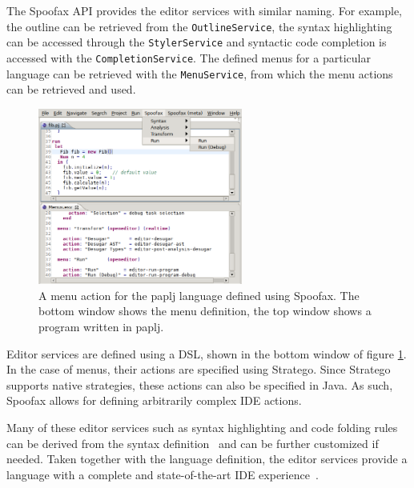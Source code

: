 The Spoofax API provides the editor services with similar naming. For
example, the outline can be retrieved from the \texttt{OutlineService}, the
syntax highlighting can be accessed through the \texttt{StylerService} and
syntactic code completion is accessed with the
\texttt{CompletionService}. The defined menus for a particular language can
be retrieved with the \texttt{MenuService}, from which the menu actions can
be retrieved and used.

\begin{figure}[htb]
\centering
\includegraphics[width=0.6\textwidth]{./img/menu-actions.png}
\caption{\label{fig:menu-actions}
A menu action for the paplj language defined using Spoofax. The bottom window shows the menu definition, the top window shows a program written in paplj.}
\end{figure}

Editor services are defined using a DSL, shown in the bottom window of
figure \ref{fig:menu-actions}. In the case of menus, their actions are
specified using Stratego. Since Stratego supports native strategies,
these actions can also be specified in Java. As such, Spoofax allows
for defining arbitrarily complex IDE actions.

Many of these editor services such as syntax highlighting and code
folding rules can be derived from the syntax
definition~\cite{Kats10c} and can be further customized if
needed. Taken together with the language definition, the editor
services provide a language with a complete and state-of-the-art IDE
experience~\cite{Kats10a}.
